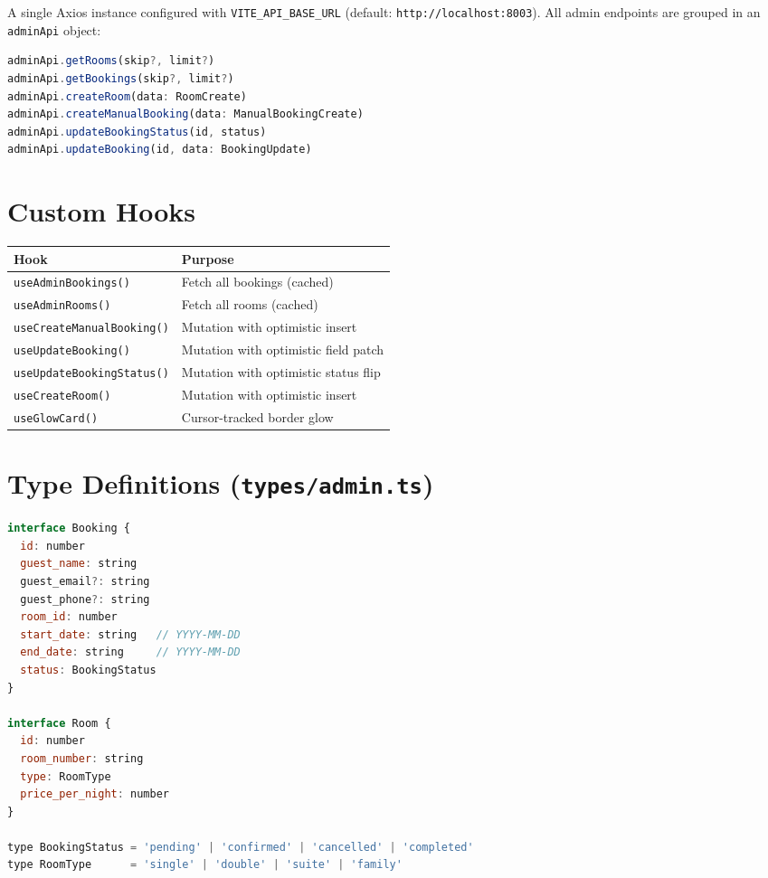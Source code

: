 \documentclass[12pt,a4paper]{report}
\begin{document}
A single Axios instance configured with \texttt{VITE\_API\_BASE\_URL}
(default: \texttt{http://localhost:8003}). All admin endpoints are grouped
in an \texttt{adminApi} object:

\begin{lstlisting}[language=JavaScript, caption={adminApi method signatures}]
adminApi.getRooms(skip?, limit?)
adminApi.getBookings(skip?, limit?)
adminApi.createRoom(data: RoomCreate)
adminApi.createManualBooking(data: ManualBookingCreate)
adminApi.updateBookingStatus(id, status)
adminApi.updateBooking(id, data: BookingUpdate)
\end{lstlisting}

\section{Custom Hooks}

\begin{center}
\begin{tabular}{ll}
  \toprule
  \textbf{Hook} & \textbf{Purpose} \\
  \midrule
  \texttt{useAdminBookings()}      & Fetch all bookings (cached) \\
  \texttt{useAdminRooms()}         & Fetch all rooms (cached) \\
  \texttt{useCreateManualBooking()} & Mutation with optimistic insert \\
  \texttt{useUpdateBooking()}      & Mutation with optimistic field patch \\
  \texttt{useUpdateBookingStatus()} & Mutation with optimistic status flip \\
  \texttt{useCreateRoom()}         & Mutation with optimistic insert \\
  \texttt{useGlowCard()}           & Cursor-tracked border glow \\
  \bottomrule
\end{tabular}
\end{center}

\section{Type Definitions (\texttt{types/admin.ts})}

\begin{lstlisting}[language=JavaScript, caption={Core TypeScript interfaces}]
interface Booking {
  id: number
  guest_name: string
  guest_email?: string
  guest_phone?: string
  room_id: number
  start_date: string   // YYYY-MM-DD
  end_date: string     // YYYY-MM-DD
  status: BookingStatus
}

interface Room {
  id: number
  room_number: string
  type: RoomType
  price_per_night: number
}

type BookingStatus = 'pending' | 'confirmed' | 'cancelled' | 'completed'
type RoomType      = 'single' | 'double' | 'suite' | 'family'
\end{lstlisting}
\end{document}
